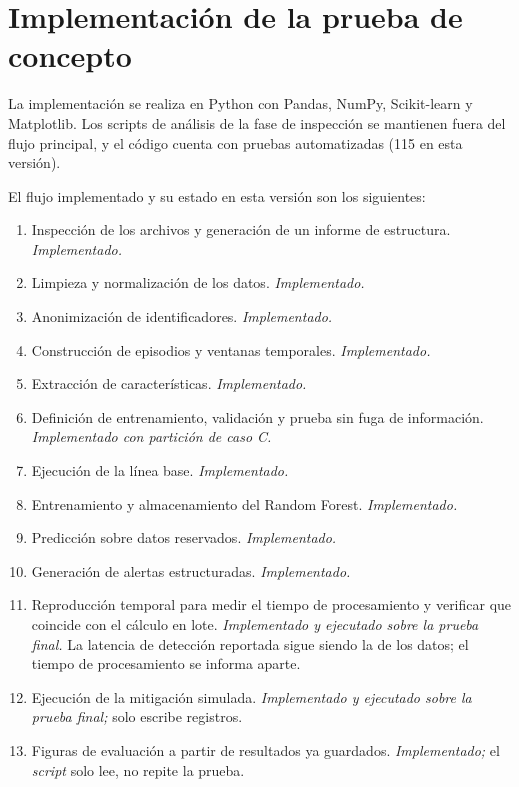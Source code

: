 \documentclass[journal]{IEEEtran}
\begin{document}
\section{Implementación de la prueba de concepto}

La implementación se realiza en Python con Pandas, NumPy, Scikit-learn y Matplotlib. Los scripts de análisis de la fase de inspección se mantienen fuera del flujo principal, y el código cuenta con pruebas automatizadas (115 en esta versión).

El flujo implementado y su estado en esta versión son los siguientes:

\begin{enumerate}
    \item Inspección de los archivos y generación de un informe de estructura. \textit{Implementado.}
    \item Limpieza y normalización de los datos. \textit{Implementado.}
    \item Anonimización de identificadores. \textit{Implementado.}
    \item Construcción de episodios y ventanas temporales. \textit{Implementado.}
    \item Extracción de características. \textit{Implementado.}
    \item Definición de entrenamiento, validación y prueba sin fuga de información. \textit{Implementado con partición de caso C.}
    \item Ejecución de la línea base. \textit{Implementado.}
    \item Entrenamiento y almacenamiento del Random Forest. \textit{Implementado.}
    \item Predicción sobre datos reservados. \textit{Implementado.}
    \item Generación de alertas estructuradas. \textit{Implementado.}
    \item Reproducción temporal para medir el tiempo de procesamiento y verificar que coincide con el cálculo en lote. \textit{Implementado y ejecutado sobre la prueba final.} La latencia de detección reportada sigue siendo la de los datos; el tiempo de procesamiento se informa aparte.
    \item Ejecución de la mitigación simulada. \textit{Implementado y ejecutado sobre la prueba final;} solo escribe registros.
    \item Figuras de evaluación a partir de resultados ya guardados. \textit{Implementado;} el \textit{script} solo lee, no repite la prueba.
\end{enumerate}
\end{document}
